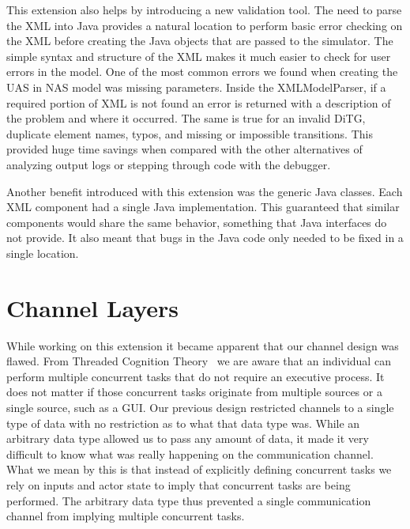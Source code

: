 This extension also helps by introducing a new validation tool.  The need to parse the XML into Java provides a natural location to perform basic error checking on the XML before creating the Java objects that are passed to the simulator. The simple syntax and structure of the XML makes it much easier to check for user errors in the model.  One of the most common errors we found when creating the UAS in NAS model was missing parameters.  Inside the XMLModelParser, if a required portion of XML is not found an error is returned with a description of the problem and where it occurred.  The same is true for an invalid DiTG, duplicate element names, typos, and missing or impossible transitions.  This provided huge time savings when compared with the other alternatives of analyzing output logs or stepping through code with the debugger.

Another benefit introduced with this extension was the generic Java classes.  Each XML component had a single Java implementation.  This guaranteed that similar components would share the same behavior, something that Java interfaces do not provide.  It also meant that bugs in the Java code only needed to be fixed in a single location.

\section{Channel Layers}

While working on this extension it became apparent that our channel design was flawed.  From Threaded Cognition Theory~\cite{salvucci2008threaded} we are aware that an individual can perform multiple concurrent tasks that do not require an executive process.  It does not matter if those concurrent tasks originate from multiple sources or a single source, such as a GUI.  Our previous design restricted channels to a single type of data with no restriction as to what that data type was.  While an arbitrary data type allowed us to pass any amount of data, it made it very difficult to know what was really happening on the communication channel.  What we mean by this is that instead of explicitly defining concurrent tasks we rely on inputs and actor state to imply that concurrent tasks are being performed.  The arbitrary data type thus prevented a single communication channel from implying multiple concurrent tasks.

